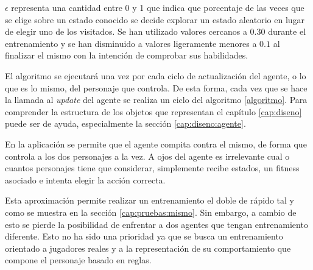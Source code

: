 \bigskip


\textbf{$\epsilon$} representa una cantidad entre 0 y 1 que indica que porcentaje de las veces que se elige sobre un estado conocido se decide explorar un estado aleatorio en lugar de  elegir uno de los visitados. Se han utilizado valores cercanos a $0.30$ durante el entrenamiento y se han disminuido a valores ligeramente menores a $0.1$ al finalizar el mismo con la intención de comprobar sus habilidades.

\bigskip

El algoritmo se ejecutará una vez por cada ciclo de actualización del agente, o lo que es lo mismo, del personaje que controla. De esta forma, cada vez que se hace la llamada al \textit{update} del agente se realiza un ciclo del algoritmo \ref{algoritmo}. Para comprender la estructura de los objetos que representan el capítulo \ref{cap:diseno} puede ser de ayuda, especialmente la sección \ref{cap:diseno:agente}.

\bigskip

En la aplicación se permite que el agente compita contra el mismo, de forma que controla a los dos personajes a la vez. A ojos del agente es irrelevante cual o cuantos personajes tiene que considerar, simplemente recibe estados, un fitness asociado e intenta elegir la acción correcta.

\bigskip

Esta aproximación permite realizar un entrenamiento el doble de rápido tal y como se muestra en la sección \ref{cap:pruebas:mismo}. Sin embargo, a cambio de esto se pierde la posibilidad de enfrentar a dos agentes que tengan entrenamiento diferente. Esto no ha sido una prioridad ya que se busca un entrenamiento orientado a jugadores reales y a la representación de su comportamiento que compone el personaje basado en reglas.




